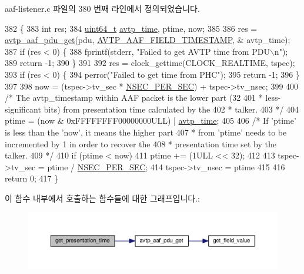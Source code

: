 aaf-\/listener.\+c 파일의 380 번째 라인에서 정의되었습니다.


\begin{DoxyCode}
382 \{
383     \textcolor{keywordtype}{int} res;
384     \hyperlink{parse_8c_aec6fcb673ff035718c238c8c9d544c47}{uint64\_t} \hyperlink{avtp_8h_a81ec49d93f7a916531f4d97214f47515}{avtp\_time}, ptime, now;
385 
386     res = \hyperlink{avtp__aaf_8h_acc4c927b036e22def8e6b6beb3ac6026}{avtp\_aaf\_pdu\_get}(pdu, \hyperlink{avtp__aaf_8h_a7eaee6c1ebc806c0401dbe7b14cd22dba2b2d9a400ce400921c5e96caabf8a631}{AVTP\_AAF\_FIELD\_TIMESTAMP}, &
      avtp\_time);
387     \textcolor{keywordflow}{if} (res < 0) \{
388         fprintf(stderr, \textcolor{stringliteral}{"Failed to get AVTP time from PDU\(\backslash\)n"});
389         \textcolor{keywordflow}{return} -1;
390     \}
391 
392     res = clock\_gettime(CLOCK\_REALTIME, tspec);
393     \textcolor{keywordflow}{if} (res < 0) \{
394         perror(\textcolor{stringliteral}{"Failed to get time from PHC"});
395         \textcolor{keywordflow}{return} -1;
396     \}
397 
398     now = (tspec->tv\_sec * \hyperlink{aaf-listener_8c_a0501e82515b2bdf36453c4cc80f5e0cc}{NSEC\_PER\_SEC}) + tspec->tv\_nsec;
399 
400     \textcolor{comment}{/* The avtp\_timestamp within AAF packet is the lower part (32}
401 \textcolor{comment}{     * less-significant bits) from presentation time calculated by the}
402 \textcolor{comment}{     * talker.}
403 \textcolor{comment}{     */}
404     ptime = (now & 0xFFFFFFFF00000000ULL) | \hyperlink{avtp_8h_a81ec49d93f7a916531f4d97214f47515}{avtp\_time};
405 
406     \textcolor{comment}{/* If 'ptime' is less than the 'now', it means the higher part}
407 \textcolor{comment}{     * from 'ptime' needs to be incremented by 1 in order to recover the}
408 \textcolor{comment}{     * presentation time set by the talker.}
409 \textcolor{comment}{     */}
410     \textcolor{keywordflow}{if} (ptime < now)
411         ptime += (1ULL << 32);
412 
413     tspec->tv\_sec = ptime / \hyperlink{aaf-listener_8c_a0501e82515b2bdf36453c4cc80f5e0cc}{NSEC\_PER\_SEC};
414     tspec->tv\_nsec = ptime %
415 
416     \textcolor{keywordflow}{return} 0;
417 \}
\end{DoxyCode}


이 함수 내부에서 호출하는 함수들에 대한 그래프입니다.\+:
\nopagebreak
\begin{figure}[H]
\begin{center}
\leavevmode
\includegraphics[width=350pt]{aaf-listener_8c_adcf17f48b1ca0dde610d14b0212c023d_cgraph}
\end{center}
\end{figure}




